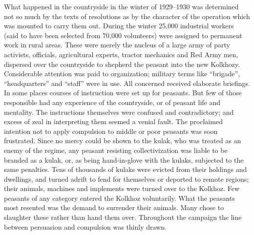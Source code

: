 What happened in the countryside in the winter of 1929--1930 was determined not so much by the texts of resolutions as by the character of the operation which was mounted to carry them out. During the winter 25,000 industrial workers (said to have been selected from 70,000 volunteers) were assigned to permanent work in rural areas. These were merely the nucleus of a large army of party activists, officials, agricultural experts, tractor mechanics and Red Army men, dispersed over the countryside to shepherd the peasant into the new Kolkhozy. Considerable attention was paid to organization; military terms like ``brigade'', ``headquarters'' and ``staff'' were in use. All concerned received elaborate briefings. In some places courses of instruction were set up for peasants. But few of those responsible had any experience of the countryside, or of peasant life and mentality. The instructions themselves were confused and contradictory; and excess of zeal in interpreting them seemed a venial fault. The proclaimed intention not to apply compulsion to middle or poor peasants was soon frustrated. Since no mercy could be shown to the kulak, who was treated as an enemy of the regime, any peasant resisting collectivization was liable to be branded as a kulak, or, as being hand-in-glove with the kulaks, subjected to the same penalties. Tens of thousands of kulaks were evicted from their holdings and dwellings, and turned adrift to fend for themselves or deported to remote regions; their animals, machines and implements were turned over to the Kolkhoz. Few peasants of any category entered the Kolkhoz voluntarily. What the peasants most resented was the demand to surrender their animals. Many chose to slaughter these rather than hand them over. Throughout the campaign the line between persuasion and compulsion was thinly drawn. 


